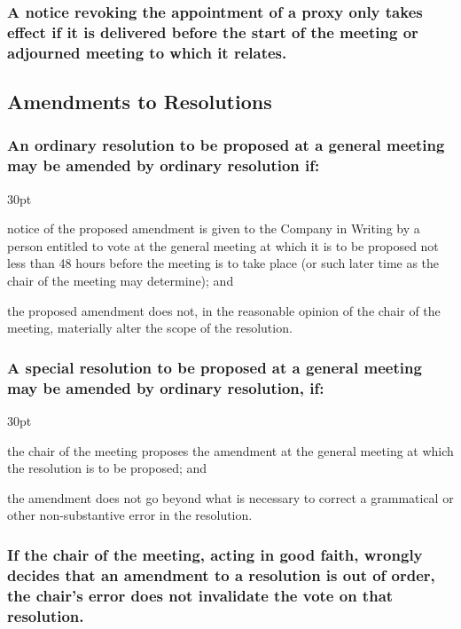 \documentclass[12pt]{article}
\def\clauseindent{30pt}
\newenvironment{subindentpara}{\raggedright\begin{adjustwidth}{\clauseindent}{}\begin{hanginglist}}{\end{hanginglist}\end{adjustwidth}}
\begin{document}
\subsubsection[Specifics of Revocation of Proxy Notices]{A notice revoking the appointment of a proxy only takes effect if it is delivered before the start of the meeting or adjourned meeting to which it relates.}

\subsection{Amendments to Resolutions}
\subsubsection[Amendments to Ordinary Resolutions]{An ordinary resolution to be proposed at a general meeting may be amended by ordinary resolution if:}
\begin{subindentpara}
    \item notice of the proposed amendment is given to the Company in Writing by a person entitled to vote at the general meeting at which it is to be proposed not less than 48 hours before the meeting is to take place (or such later time as the chair of the meeting may determine); and
    \item the proposed amendment does not, in the reasonable opinion of the chair of the meeting, materially alter the scope of the resolution.
\end{subindentpara}
\subsubsection[Amendments to Special Resolutions]{A special resolution to be proposed at a general meeting may be amended by ordinary resolution, if:}
\begin{subindentpara}
    \item the chair of the meeting proposes the amendment at the general meeting at which the resolution is to be proposed; and
    \item the amendment does not go beyond what is necessary to correct a grammatical or other non-substantive error in the resolution.
\end{subindentpara}
\subsubsection[Amendments Wrongly Considered Out-of-Order]{If the chair of the meeting, acting in good faith, wrongly decides that an amendment to a resolution is out of order, the chair's error does not invalidate the vote on that resolution.}
\end{document}
